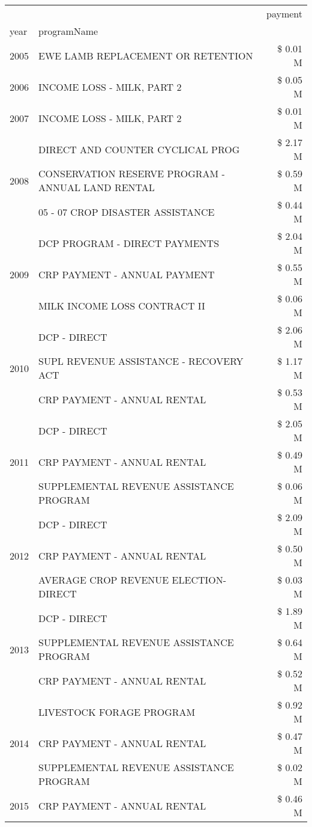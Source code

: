\begin{tabular}{llr}
\toprule
 &  & payment \\
year & programName &  \\
\midrule
2005 & EWE LAMB REPLACEMENT OR RETENTION & \$ 0.01 M \\
\cline{1-3}
2006 & INCOME LOSS - MILK, PART 2 & \$ 0.05 M \\
\cline{1-3}
2007 & INCOME LOSS - MILK, PART 2 & \$ 0.01 M \\
\cline{1-3}
\multirow[t]{3}{*}{2008} & DIRECT AND COUNTER CYCLICAL PROG & \$ 2.17 M \\
 & CONSERVATION RESERVE PROGRAM - ANNUAL LAND RENTAL & \$ 0.59 M \\
 & 05 - 07 CROP DISASTER ASSISTANCE & \$ 0.44 M \\
\cline{1-3}
\multirow[t]{3}{*}{2009} & DCP PROGRAM - DIRECT PAYMENTS & \$ 2.04 M \\
 & CRP PAYMENT - ANNUAL PAYMENT & \$ 0.55 M \\
 & MILK INCOME LOSS CONTRACT II & \$ 0.06 M \\
\cline{1-3}
\multirow[t]{3}{*}{2010} & DCP - DIRECT & \$ 2.06 M \\
 & SUPL REVENUE ASSISTANCE - RECOVERY ACT & \$ 1.17 M \\
 & CRP PAYMENT - ANNUAL RENTAL & \$ 0.53 M \\
\cline{1-3}
\multirow[t]{3}{*}{2011} & DCP - DIRECT & \$ 2.05 M \\
 & CRP PAYMENT - ANNUAL RENTAL & \$ 0.49 M \\
 & SUPPLEMENTAL REVENUE ASSISTANCE PROGRAM & \$ 0.06 M \\
\cline{1-3}
\multirow[t]{3}{*}{2012} & DCP - DIRECT & \$ 2.09 M \\
 & CRP PAYMENT - ANNUAL RENTAL & \$ 0.50 M \\
 & AVERAGE CROP REVENUE ELECTION-DIRECT & \$ 0.03 M \\
\cline{1-3}
\multirow[t]{3}{*}{2013} & DCP - DIRECT & \$ 1.89 M \\
 & SUPPLEMENTAL REVENUE ASSISTANCE PROGRAM & \$ 0.64 M \\
 & CRP PAYMENT - ANNUAL RENTAL & \$ 0.52 M \\
\cline{1-3}
\multirow[t]{3}{*}{2014} & LIVESTOCK FORAGE PROGRAM & \$ 0.92 M \\
 & CRP PAYMENT - ANNUAL RENTAL & \$ 0.47 M \\
 & SUPPLEMENTAL REVENUE ASSISTANCE PROGRAM & \$ 0.02 M \\
\cline{1-3}
\multirow[t]{3}{*}{2015} & CRP PAYMENT - ANNUAL RENTAL & \$ 0.46 M \\

\end{tabular}
